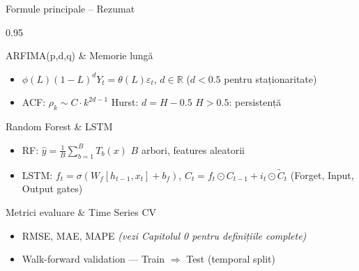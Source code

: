 \documentclass[9pt, aspectratio=169, t]{beamer}
\begin{document}
\begin{frame}{Formule principale -- Rezumat}
    \vspace{-3mm}
    \begin{cminipage}{0.95\textwidth}
        {\scriptsize
        \begin{block}{ARFIMA(p,d,q) \& Memorie lungă}
            \begin{itemize}\setlength{\itemsep}{0pt}
                \item $\phi(L)(1-L)^d Y_t = \theta(L)\varepsilon_t$, \; $d \in \mathbb{R}$ ($d < 0.5$ pentru staționaritate)
                \item ACF: $\rho_k \sim C \cdot k^{2d-1}$ \quad Hurst: $d = H - 0.5$ \quad $H > 0.5$: persistență
            \end{itemize}
        \end{block}
        \vspace{-2mm}
        \begin{block}{Random Forest \& LSTM}
            \begin{itemize}\setlength{\itemsep}{0pt}
                \item RF: $\hat{y} = \frac{1}{B}\sum_{b=1}^{B} T_b(x)$ \quad $B$ arbori, features aleatorii
                \item LSTM: $f_t = \sigma(W_f[h_{t-1}, x_t] + b_f)$, \; $C_t = f_t \odot C_{t-1} + i_t \odot \tilde{C}_t$ \quad (Forget, Input, Output gates)
            \end{itemize}
        \end{block}
        \vspace{-2mm}
        \begin{block}{Metrici evaluare \& Time Series CV}
            \begin{itemize}\setlength{\itemsep}{0pt}
                \item RMSE, MAE, MAPE \textit{(vezi Capitolul 0 pentru definițiile complete)}
                \item Walk-forward validation --- Train $\Rightarrow$ Test (temporal split)
            \end{itemize}
        \end{block}
        }
    \end{cminipage}
\end{frame}

\end{document}

